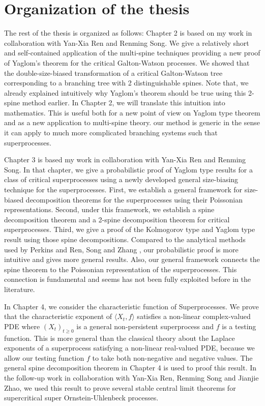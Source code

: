 \documentclass[UTF8]{pkuthss}
\theoremstyle{plain}
\theoremstyle{definition}
\numberwithin{equation}{section}
\begin{document}
\section{Organization of the thesis}
	The rest of the thesis is organized as follows:
	Chapter 2 is based on my work \cite{RenSongSun2018A-2-spine} in collaboration with Yan-Xia Ren and Renming Song.
    We give a relatively short and self-contained application of the multi-spine techniques providing a new proof of Yaglom's theorem for the critical Galton-Watson processes. 
    We showed that the double-size-biased transformation of a critical Galton-Watson tree corresponding to a branching tree with 2 distinguishable spines. 
    Note that, we already explained intuitively why Yaglom's theorem should be true using this 2-spine method earlier. 
    In Chapter 2, we will translate this intuition into mathematics. This is useful both for a new point of view on Yaglom type theorem and as a new application to multi-spine theory. our method is generic in the sense it can apply to much more complicated branching systems such that superprocesses. 

    Chapter 3 is based my work \cite{RenSongSun2017Spine} in collaboration with Yan-Xia Ren and Renming Song. In that chapter, we give a probabilistic proof of Yaglom type results for a class of critical superprocesses using a newly developed general size-biasing technique for the superprocesses. First, we establish a general framework for size-biased decomposition theorems for the superprocesses using their Poissonian representations. Second, under this framework, we establish a spine decomposition theorem and a 2-spine decomposition theorem for critical superprocesses. Third, we give a proof of the Kolmogorov type and Yaglom type result using those spine decompositions.  Compared to the analytical methods used by Perkins \cite{EvansPerkins1990Measure-valued} and Ren, Song and Zhang \cite{RenSongZhang2015Limit}, our probabilistic proof is more intuitive and gives more general results. Also, our general framework connects the spine theorem to the Poissonian representation of the superprocesses. This connection is fundamental and seems has not been fully exploited before in the literature. 

    In Chapter 4, we consider the characteristic function of Superprocesses. We prove that the characteristic exponent of $\langle X_t,f\rangle$ satisfies a non-linear complex-valued PDE where $(X_t)_{t\geq 0}$ is a general non-persistent superprocess and $f$ is a testing function. 
    This is more general than the classical theory about the Laplace exponents of a superprocess satisfying a non-linear real-valued PDE, because we allow our testing function $f$ to take both non-negative and negative values. The general spine decomposition theorem in Chapter 4 is used to proof this result. In the follow-up work \cite{RenSongSunZhao2019Stable} in collaboration with Yan-Xia Ren, Renming Song and Jianjie Zhao, we used this result to prove several stable central limit theorems for supercritical super Ornstein-Uhlenbeck processes.
    
\end{document}
